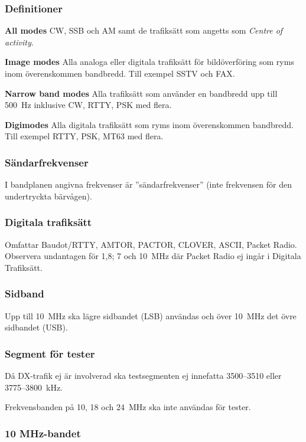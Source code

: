 \subsubsection{Definitioner}

\textbf{All modes} CW, SSB och AM samt de trafiksätt som angetts som
\emph{Centre of activity}.

\textbf{Image modes} Alla analoga eller digitala trafiksätt för bildöverföring
som ryms inom överenskommen bandbredd. Till exempel SSTV och FAX.

\textbf{Narrow band modes} Alla trafiksätt som använder en bandbredd upp till
500~Hz inklusive CW, RTTY, PSK med flera.

\textbf{Digimodes} Alla digitala trafiksätt som ryms inom överenskommen
bandbredd. Till exempel RTTY, PSK, MT63 med flera.

\subsubsection{Sändarfrekvenser}

I bandplanen angivna frekvenser är ''sändarfrekvenser''
(inte frekvensen för den undertryckta bärvågen).

\subsubsection{Digitala trafiksätt}

Omfattar Baudot/RTTY, AMTOR, PACTOR, CLOVER, ASCII, Packet Radio.
Observera undantagen för 1,8; 7 och 10~MHz där Packet Radio ej
ingår i Digitala Trafiksätt.

\subsubsection{Sidband}

Upp till 10~MHz ska lägre sidbandet (LSB) användas och över 10~MHz det övre
sidbandet (USB).

\subsubsection{Segment för tester}

Då DX-trafik ej är involverad ska testsegmenten ej innefatta
3500--3510 eller 3775--3800~kHz.

Frekvensbanden på 10, 18 och 24~MHz ska inte användas för tester.

\subsubsection{10 MHz-bandet}

